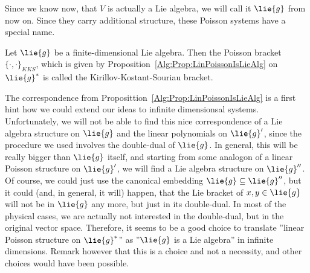 Since we know now, that $V$ is actually a Lie algebra, we will call it 
$\lie{g}$ from now on. Since they carry additional structure, these Poisson 
systems have a special name.
\begin{definition}
	\label{Def:KKS}
	Let $\lie{g}$ be a finite-dimensional Lie algebra. Then the Poisson 
	bracket $\{ \cdot , \cdot \}_{KKS}$, which is given by 
	Proposition~\ref{Alg:Prop:LinPoissonIsLieAlg} on $\lie{g}^*$ is called the 
	Kirillov-Kostant-Souriau bracket.
\end{definition}



The correspondence from Proposittion~\ref{Alg:Prop:LinPoissonIsLieAlg} is a 
first hint how we could extend our ideas to infinite dimensionsal systems. 
Unfortunately, we will not be able to find this nice 
correspondence of a Lie algebra structure on $\lie{g}$ and the linear 
polynomials on $\lie{g}'$, since the procedure we used involves the 
double-dual of $\lie{g}$. In general, this will be really bigger than 
$\lie{g}$ itself, and starting from some analogon of a linear Poisson 
structure on $\lie{g}'$, we will find a Lie algebra structure on $\lie{g}''$. 
Of course, we could just use the canonical embedding $\lie{g} \subseteq 
\lie{g}''$, but it could (and, in general, it will) happen, that the Lie 
bracket of $x,y \in \lie{g}$ will not be in $\lie{g}$ any more, but just in 
its double-dual. In most of the physical cases, we are actually not interested 
in the double-dual, but in the original vector space. Therefore, it seems to 
be a good choice to translate ''linear Poisson structure on $\lie{g}^*$'' as 
''$\lie{g}$ is a Lie algebra'' in infinite dimensions. Remark however that 
this is a choice and not a necessity, and other choices would have been 
possible.


